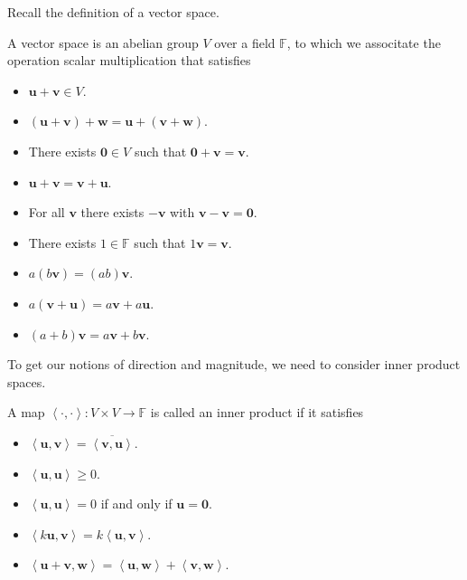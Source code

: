 Recall the definition of a vector space.
\begin{definition}\label{dfn:vs}
	A vector space is an abelian group $V$ over a field $\mathbb{F}$, to which we associtate the operation scalar multiplication that satisfies
	\begin{itemize}
		\item $\mathbf{u}+\mathbf{v}\in V$.
		\item $\left( \mathbf{u}+\mathbf{v} \right) +\mathbf{w}=\mathbf{u}+\left( \mathbf{v}+\mathbf{w} \right) $.
		\item There exists $\mathbf{0}\in V$ such that $\mathbf{0}+\mathbf{v}=\mathbf{v}$.
		\item $\mathbf{u}+\mathbf{v}=\mathbf{v}+\mathbf{u}$.
		\item For all $\mathbf{v}$ there exists $-\mathbf{v}$ with $\mathbf{v}-\mathbf{v}=\mathbf{0}$.
		\item There exists  $1\in\mathbb{F}$ such that $1\mathbf{v}=\mathbf{v}$.
		\item $a(b \mathbf{v})=(ab)\mathbf{v}$.
		\item $a(\mathbf{v}+\mathbf{u})=a \mathbf{v}+a \mathbf{u}$.
		\item $\left( a+b \right) \mathbf{v}=a \mathbf{v}+b \mathbf{v}$.
	\end{itemize}
\end{definition}
To get our notions of direction and magnitude, we need to consider inner product spaces.
\begin{definition}\label{dfn:IPs}
	A map $\left<\cdot ,\cdot  \right> : V\times V \to \mathbb{F}$ is called an inner product if it satisfies
	\begin{itemize}
		\item $\left<\mathbf{u},\mathbf{v} \right> = \overline{\left<\mathbf{v},\mathbf{u} \right>}$.
		\item $\left<\mathbf{u},\mathbf{u} \right> \geq 0$.
		\item $\left<\mathbf{u},\mathbf{u} \right> = 0$ if and only if $\mathbf{u}=\mathbf{0}$.
		\item $\left<k \mathbf{u},\mathbf{v} \right> =k\left<\mathbf{u},\mathbf{v} \right> $.
		\item $\left<\mathbf{u}+\mathbf{v},\mathbf{w} \right> = \left<\mathbf{u},\mathbf{w} \right> + \left<\mathbf{v},\mathbf{w} \right>$.
	\end{itemize}
\end{definition}
